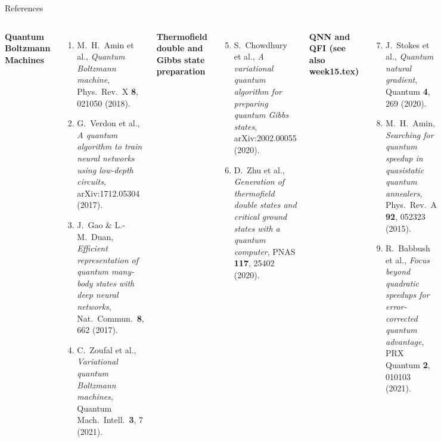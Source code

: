 \documentclass[aspectratio=169,10pt]{beamer}
\begin{document}
\begin{frame}{References}
  \begin{columns}[T]
      \textbf{Quantum Boltzmann Machines}
      \begin{enumerate}
        \item M.~H.~Amin et al., \emph{Quantum Boltzmann machine},
              Phys.\ Rev.\ X \textbf{8}, 021050 (2018).
        \item G.~Verdon et al., \emph{A quantum algorithm to train
              neural networks using low-depth circuits},
              arXiv:1712.05304 (2017).
        \item J.~Gao \& L.-M.\ Duan, \emph{Efficient representation
              of quantum many-body states with deep neural networks},
              Nat.\ Commun.\ \textbf{8}, 662 (2017).
        \item C.~Zoufal et al., \emph{Variational quantum Boltzmann
              machines}, Quantum Mach.\ Intell.\ \textbf{3}, 7 (2021).
      \end{enumerate}
      \textbf{Thermofield double and Gibbs state preparation}
      \begin{enumerate}\setcounter{enumi}{4}
        \item S.~Chowdhury et al., \emph{A variational quantum algorithm
              for preparing quantum Gibbs states},
              arXiv:2002.00055 (2020).
        \item D.~Zhu et al., \emph{Generation of thermofield double
              states and critical ground states with a quantum computer},
              PNAS \textbf{117}, 25402 (2020).
      \end{enumerate}
      \textbf{QNN and QFI (see also week15.tex)}
      \begin{enumerate}\setcounter{enumi}{6}
        \item J.~Stokes et al., \emph{Quantum natural gradient},
              Quantum \textbf{4}, 269 (2020).
        \item M.~H.~Amin, \emph{Searching for quantum speedup in
              quasistatic quantum annealers},
              Phys.\ Rev.\ A \textbf{92}, 052323 (2015).
        \item R.~Babbush et al., \emph{Focus beyond quadratic
              speedups for error-corrected quantum advantage},
              PRX Quantum \textbf{2}, 010103 (2021).
      \end{enumerate}
  \end{columns}
\end{frame}
\end{document}
